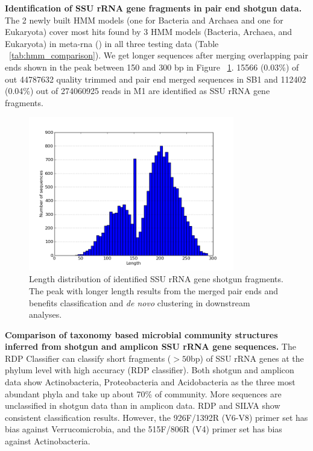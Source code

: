 \documentclass[12pt]{article}
\begin{document}
{\bf Identification of SSU rRNA gene fragments in pair end shotgun
data. } The 2 newly built HMM models (one for Bacteria and Archaea and
one for Eukaryota) cover most hits found by 3 HMM models (Bacteria,
Archaea, and Eukaryota) in meta-rna (\cite{metarna}) in all three
testing data (Table ~\ref{tab:hmm_comparison}). We get longer
sequences after merging overlapping pair ends shown in the peak
between 150 and 300 bp in Figure ~\ref{fig:read_length_dist}. 15566
(0.03\%) of out 44787632 quality trimmed and pair end merged sequences
in SB1 and 112402 (0.04\%) out of 274060925 reads in M1 are identified
as SSU rRNA gene fragments.

    \begin{figure}[tbph!]
    \centering
    \includegraphics[width=0.8\textwidth]{figs/read_length_dist.png}

    \caption[Length distribution of identified SSU rRNA gene shotgun
    fragments]{Length distribution of identified SSU rRNA gene shotgun
    fragments. The peak with longer length results from the merged
    pair ends and benefits classification and {\em de novo} clustering
    in downstream analyses.}

    \label{fig:read_length_dist}
    \end{figure}

{\bf Comparison of taxonomy based microbial community structures
inferred from shotgun and amplicon SSU rRNA gene sequences. } The RDP
Classifier can classify short fragments ($>50$bp) of SSU rRNA genes at
the phylum level with high accuracy (RDP classifier). Both shotgun and
amplicon data show Actinobacteria, Proteobacteria and Acidobacteria as
the three most abundant phyla and take up about 70\% of
community. More sequences are unclassified in shotgun data than in
amplicon data. RDP and SILVA show consistent classification
results. However, the 926F/1392R (V6-V8) primer set has bias against
Verrucomicrobia, and the 515F/806R (V4) primer set has bias against
Actinobacteria.
\end{document}
